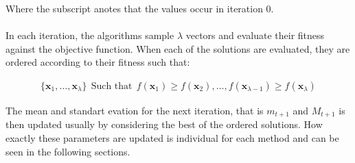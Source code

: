 Where the subscript anotes that the values occur in iteration 0.\\
\\
In each iteration, the algorithms sample $\lambda$ vectors and evaluate their fitness
against the objective function. When each of the solutions are evaluated,
they are ordered according to their fitness such that:

\begin{align*}
\{\textbf{x}_{1}, \hdots, \textbf{x}_{\lambda}\}\ \ \text{Such that}\ \ 
f(\textbf{x}_1) \geq f(\textbf{x}_2), \hdots, f(\textbf{x}_{\lambda - 1}) \geq f(\textbf{x}_{\lambda})
\end{align*}

The mean and standart evation for the next iteration, that is $m_{t+1}$ and $M_{t+1}$
is then updated usually by considering the best of the ordered solutions. How exactly
these parameters are updated is individual for each method and can be seen in the following
sections.




